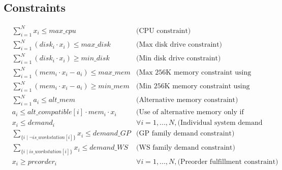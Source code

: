 \documentclass{article}
\begin{document}
\subsection*{Constraints}
\begin{align}
    & \sum_{i=1}^{N} x_i \leq max\_cpu & \text{(CPU constraint)} \\
    & \sum_{i=1}^{N} (disk_i \cdot x_i) \leq max\_disk & \text{(Max disk drive constraint)} \\
    & \sum_{i=1}^{N} (disk_i \cdot x_i) \geq min\_disk & \text{(Min disk drive constraint)} \\
    & \sum_{i=1}^{N} (mem_i \cdot x_i - a_i) \leq max\_mem & \text{(Max 256K memory constraint using main memory)} \\
    & \sum_{i=1}^{N} (mem_i \cdot x_i - a_i) \geq min\_mem & \text{(Min 256K memory constraint using main memory)} \\
    & \sum_{i=1}^{N} a_i \leq alt\_mem & \text{(Alternative memory constraint)} \\
    & a_i \leq alt\_compatible[i] \cdot mem_i \cdot x_i & \text{(Use of alternative memory only if compatible)} \\
    & x_i \leq demand_i & \forall i=1,...,N, \text{(Individual system demand constraints)} \\
    & \sum_{\{i \mid \neg is\_workstation[i]\}} x_i \leq demand\_GP & \text{(GP family demand constraint)} \\
    & \sum_{\{i \mid is\_workstation[i]\}} x_i \leq demand\_WS & \text{(WS family demand constraint)} \\
    & x_i \geq preorder_i & \forall i=1,...,N, \text{(Preorder fulfillment constraint)}
\end{align}
\end{document}
